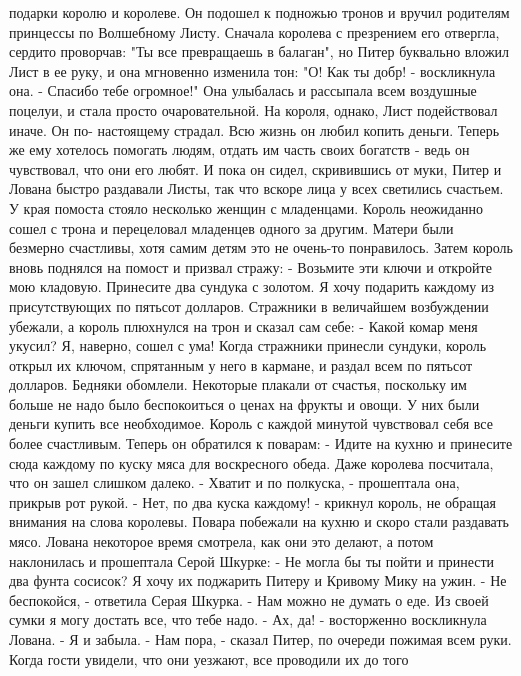 подарки королю и королеве.
    Он подошел к подножью тронов и вручил родителям принцессы по 
Волшебному Листу. Сначала королева с презрением его отвергла, сердито 
проворчав: "Ты все превращаешь в балаган", но Питер буквально вложил 
Лист в ее руку, и она мгновенно изменила тон: "О! Как ты добр! - 
воскликнула она. - Спасибо тебе огромное!"
    Она улыбалась и рассыпала всем воздушные поцелуи, и стала просто 
очаровательной. На короля, однако, Лист подействовал иначе. Он по-
настоящему страдал. Всю жизнь он любил копить деньги. Теперь же ему 
хотелось помогать людям, отдать им часть своих богатств - ведь он 
чувствовал, что они его любят. И пока он сидел, скривившись от муки, 
Питер и Лована быстро раздавали Листы, так что вскоре лица у всех 
светились счастьем.
    У края помоста стояло несколько женщин с младенцами. Король 
неожиданно сошел с трона и перецеловал младенцев одного за другим. 
Матери были безмерно счастливы, хотя самим детям это не очень-то 
понравилось.
    Затем король вновь поднялся на помост и призвал стражу:
    - Возьмите эти ключи и откройте мою кладовую. Принесите два 
сундука с золотом. Я хочу подарить каждому из присутствующих по 
пятьсот долларов.
    Стражники в величайшем возбуждении убежали, а король плюхнулся на 
трон и сказал сам себе:
    - Какой комар меня укусил? Я, наверно, сошел с ума!
    Когда стражники принесли сундуки, король открыл их ключом, 
спрятанным у него в кармане, и раздал всем по пятьсот долларов.
    Бедняки обомлели. Некоторые плакали от счастья, поскольку им 
больше не надо было беспокоиться о ценах на фрукты и овощи. У них были 
деньги купить все необходимое.
    Король с каждой минутой чувствовал себя все более счастливым. 
Теперь он обратился к поварам:
    - Идите на кухню и принесите сюда каждому по куску мяса для 
воскресного обеда.
    Даже королева посчитала, что он зашел слишком далеко.
    - Хватит и по полкуска, - прошептала она, прикрыв рот рукой.
    - Нет, по два куска каждому! - крикнул король, не обращая внимания 
на слова королевы. Повара побежали на кухню и скоро стали раздавать 
мясо.
    Лована некоторое время смотрела, как они это делают, а потом 
наклонилась и прошептала Серой Шкурке:
    - Не могла бы ты пойти и принести два фунта сосисок? Я хочу их 
поджарить Питеру и Кривому Мику на ужин.
    - Не беспокойся, - ответила Серая Шкурка. - Нам можно не думать о 
еде. Из своей сумки я могу достать все, что тебе надо.
    - Ах, да! - восторженно воскликнула Лована. - Я и забыла.
    - Нам пора, - сказал Питер, по очереди пожимая всем руки.
    Когда гости увидели, что они уезжают, все проводили их до того 
